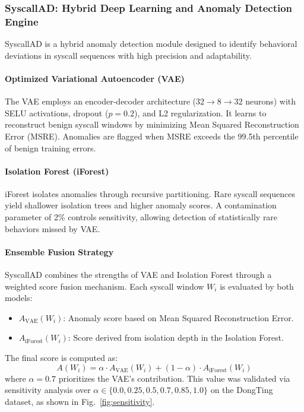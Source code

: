 \subsubsection{SyscallAD: Hybrid Deep Learning and Anomaly Detection Engine}
\label{subsubsec:syscallad}

SyscallAD is a hybrid anomaly detection module designed to identify behavioral deviations in
syscall sequences with high precision and adaptability.

\paragraph{Optimized Variational Autoencoder (VAE)}
The VAE employs an encoder-decoder architecture ($32 \to 8 \to 32$ neurons) with SELU
activations, dropout ($p = 0.2$), and L2 regularization. It learns to reconstruct benign
syscall windows by minimizing Mean Squared Reconstruction Error (MSRE). Anomalies are flagged
when MSRE exceeds the 99.5th percentile of benign training errors.

\paragraph{Isolation Forest (iForest)}
iForest isolates anomalies through recursive partitioning. Rare syscall sequences yield shallower
isolation trees and higher anomaly scores. A contamination parameter of 2\% controls sensitivity,
allowing detection of statistically rare behaviors missed by VAE.

\paragraph{Ensemble Fusion Strategy}
SyscallAD combines the strengths of VAE and Isolation Forest through a weighted score fusion
mechanism. Each syscall window $W_i$ is evaluated by both models:
\begin{itemize}
  \item $A_{\text{VAE}}(W_i)$: Anomaly score based on Mean Squared Reconstruction Error.
  \item $A_{\text{iForest}}(W_i)$: Score derived from isolation depth in the Isolation Forest.
\end{itemize}

The final score is computed as:
\begin{equation}
  A(W_i) = \alpha \cdot A_{\text{VAE}}(W_i) + (1 - \alpha) \cdot A_{\text{iForest}}(W_i)
  \label{eq:ensemble}
\end{equation}
where $\alpha = 0.7$ prioritizes the VAE's contribution. This value was validated via
sensitivity analysis over $\alpha \in \{0.0, 0.25, 0.5, 0.7, 0.85, 1.0\}$ on the DongTing
dataset, as shown in Fig.~\ref{fig:sensitivity}.

